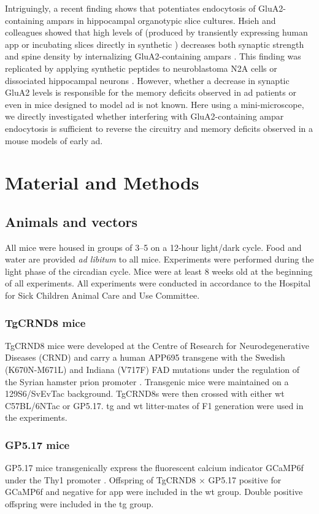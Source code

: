 Intriguingly, a recent finding shows that \abeta{} potentiates endocytosis of GluA2-containing \glspl{ampar} in hippocampal organotypic slice cultures.  Hsieh and colleagues showed that high levels of \abeta{} (produced by transiently expressing human \gls{app} or incubating slices directly in synthetic \abeta) decreases both synaptic strength and spine density by internalizing GluA2-containing \glspl{ampar} \citep{hsieh06}. This finding was replicated by applying synthetic \abeta{} peptides to neuroblastoma N2A cells \citep{zhao10} or dissociated hippocampal neurons \citep{liu10, zhao10}. However, whether a decrease in synaptic GluA2 levels is responsible for the memory deficits observed in \gls{ad} patients or even in mice designed to model \gls{ad} is not known. Here using a mini-microscope, we directly investigated whether interfering with GluA2-containing \gls{ampar} endocytosis is sufficient to reverse the circuitry and memory deficits observed in a mouse models of early \gls{ad}.
\section{Material and Methods}

\subsection{Animals and vectors}
All mice were housed in groups of 3--5 on a 12-hour light/dark cycle. Food and water are provided \textit{ad libitum} to all mice. Experiments were performed during the light phase of the circadian cycle. Mice were at least 8 weeks old at the beginning of all experiments. All experiments were conducted in accordance to the Hospital for Sick Children Animal Care and Use Committee.

\subsubsection{TgCRND8 mice}
TgCRND8 mice were developed at the Centre of Research for Neurodegenerative Diseases (CRND) and carry a human APP695 transgene with the Swedish (K670N-M671L) and Indiana (V717F) FAD mutations under the regulation of the Syrian hamster prion promoter \citep{chishti01}. Transgenic mice were maintained on a 129S6/SvEvTac background. TgCRND8s were then crossed with either \gls{wt} C57BL/6NTac or GP5.17. \Gls{tg} and \gls{wt} litter-mates of F1 generation were used in the experiments.


\subsubsection{GP5.17 mice}
GP5.17 mice transgenically express the fluorescent calcium indicator GCaMP6f under the Thy1 promoter \citep{dana14}. Offspring of TgCRND8 $\times$ GP5.17 positive for GCaMP6f and negative for \gls{app} were included in the \gls{wt} group. Double positive offspring were included in the \gls{tg} group.


